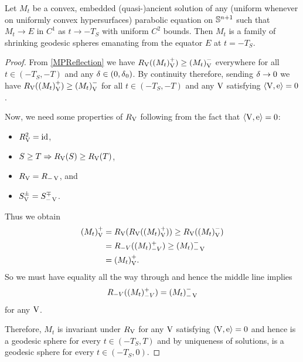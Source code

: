 \documentclass{amsart}
\begin{document}
\begin{thm}
\label{thm:classification}
Let \(M_t\) be a convex, embedded (quasi-)ancient solution of any (uniform whenever on uniformly convex hypersurfaces) parabolic equation on \(\S^{n+1}\) such that \(M_t \to E\) in \(C^1\) as \(t \to -T_S\) with uniform \(C^2\) bounds. Then \(M_t\) is a family of shrinking geodesic spheres emanating from the equator \(E\) at \(t=-T_S\).
\end{thm}
\begin{proof}
From \cref{MPReflection} we have \(\reflectionmap(\reflectionset{(M_t)}^+) \geq \reflectionset{(M_t)}^-\) everywhere for all \(t \in (-T_S, -T)\) and any \(\reflectionangle \in (0,\reflectionangle_0)\). By continuity therefore, sending \(\reflectionangle \to 0\) we have \(\reflectionmap(\reflectionset{(M_t)}^+) \geq \reflectionset{(M_t)}^-\) for all \(t \in (-T_S, -T)\)  and any \(\reflectionvector\) satisfying \(\ip{\reflectionvector}{\vertvec} = 0\).

Now, we need some properties of $\reflectionmap[\reflectionvector]$ following from the fact that $\ip{\reflectionvector}{\vertvec} = 0$:
\begin{itemize}
\item $\reflectionmap^2 = \id$,
\item $S \geq T \Rightarrow \reflectionmap(S) \geq  \reflectionmap(T)$,
\item $\reflectionmap = \reflectionmap[-\reflectionvector]$, and
\item $\reflectionset{S}^{\pm} = \reflectionset[-\reflectionvector]{S}^{\mp}$.
\end{itemize}
Thus we obtain
\begin{align*}
\reflectionset{(M_t)}^+ &= \reflectionmap(\reflectionmap(\reflectionset{(M_t)}^+)) \geq \reflectionmap(\reflectionset{(M_t)}^-) \\
&= R_{-V}((M_t)^+_{-V}) \geq \reflectionset[-\reflectionvector]{(M_t)}^-\\
&= \reflectionset{(M_t)}^+.
\end{align*}
So we must have equality all the way through and hence the middle line implies
\[
R_{-V}((M_t)^+_{-V}) = \reflectionset[-\reflectionvector]{(M_t)}^-
\]
for any $\reflectionvector$.

Therefore, \(M_t\) is invariant under \(\reflectionmap\) for any \(\reflectionvector\) satisfying \(\ip{\reflectionvector}{\vertvec} = 0\) and hence is a geodesic sphere for every \(t \in (-T_S, T)\) and by uniqueness of solutions, is a geodesic sphere for every \(t \in (-T_S, 0)\).
\end{proof}



\end{document}
